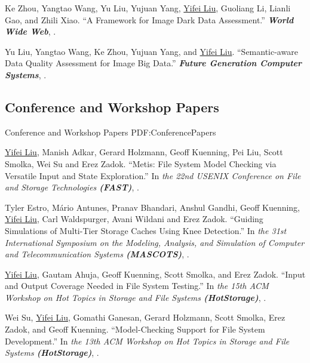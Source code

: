 \documentclass[a4paper,10pt,oneside]{article}
\begin{document}
\begin{body}

\NumberedItem{[2]}
Ke Zhou, Yangtao Wang, Yu Liu, Yujuan Yang, \underline{Yifei Liu}, Guoliang Li, Lianli Gao, and Zhili Xiao.
``A Framework for Image Dark Data Assessment.'' 
\textit{\textbf{World Wide Web}},
.


\NumberedItem{[3]}
Yu Liu, Yangtao Wang, Ke Zhou, Yujuan Yang, and \underline{Yifei Liu}.
``Semantic-aware Data Quality Assessment for Image Big Data.'' 
\textit{\textbf{Future Generation Computer Systems}},
.

\subsection
{Conference and Workshop Papers}
{Conference and Workshop Papers}
{PDF:ConferencePapers}

\NumberedItem{[1]}
\underline{Yifei Liu}, Manish Adkar, Gerard Holzmann, Geoff Kuenning, Pei Liu, Scott Smolka, Wei Su and Erez Zadok.
``Metis: File System Model Checking via Versatile Input and State Exploration.''
In \textit{the 22nd USENIX Conference on File and Storage Technologies
\textbf{(FAST)}}, %
. 

\NumberedItem{[2]}
Tyler Estro, Mário Antunes, Pranav Bhandari, Anshul Gandhi, Geoff Kuenning, \underline{Yifei Liu}, Carl Waldspurger, Avani Wildani and Erez Zadok.
``Guiding Simulations of Multi-Tier Storage Caches Using Knee Detection.''
In \textit{the 31st International Symposium on the Modeling, Analysis, and Simulation of Computer and Telecommunication Systems \textbf{(MASCOTS)}}, %
. 

\Gap

\NumberedItem{[3]}
\underline{Yifei Liu}, Gautam Ahuja, Geoff Kuenning, Scott Smolka, and Erez Zadok.
``Input and Output Coverage Needed in File System Testing.''
In \textit{the 15th ACM Workshop on Hot Topics in Storage and File Systems \textbf{(HotStorage)}}, %
.


\NumberedItem{[4]}
Wei Su, \underline{Yifei Liu}, Gomathi Ganesan, Gerard Holzmann, Scott Smolka, Erez Zadok, and Geoff Kuenning.
``Model-Checking Support for File System Development.''
In \textit{the 13th ACM Workshop on Hot Topics in Storage and File Systems \textbf{(HotStorage)}}, %
.


\end{body}
\end{document}
